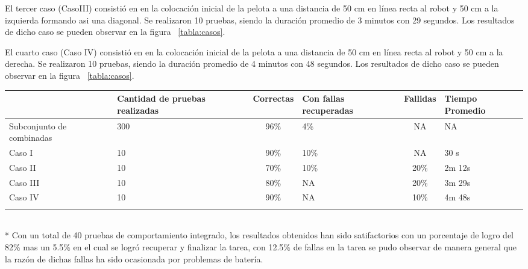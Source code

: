 El tercer caso  (CasoIII) consistió en en la colocación inicial de la pelota a una distancia de 50 cm en línea recta al robot y 50 cm a la izquierda formando asi una diagonal. Se realizaron 10 pruebas, siendo la duración promedio de 3 minutos con 29 segundos. Los resultados de dicho caso se pueden observar en la figura ~\ref{tabla:casos}. 


El cuarto caso (Caso IV) consistió en en la colocación inicial de la pelota a una distancia de 50 cm en línea recta al robot y 50 cm a la derecha. Se realizaron 10 pruebas, siendo la duración promedio de 4 minutos con 48 segundos. Los resultados de dicho caso se pueden observar en la figura ~\ref{tabla:casos}. 


\begin{tabular}{|p{3cm}|p{2cm}|c|p{2cm}|c|p{2cm}|}
\hline 
& Cantidad de 
pruebas realizadas & Correctas & Con fallas recuperadas & Fallidas & Tiempo Promedio \\ 
\hline 
Subconjunto de combinadas & 300 & 96\% & 4\% & NA & NA \\ 
\hline 
Caso I & 10 & 90\% & 10\% & NA & 30 s \\ 
\hline 
Caso II & 10 & 70\% & 10\% & 20\% & 2m 12s \\ 
\hline 
Caso III & 10 & 80\% & NA & 20\% & 3m 29s \\ 
\hline 
Caso IV & 10 & 90\% & NA & 10\% & 4m 48s \\ 
\hline 
\label{tabla:casos}
\end{tabular} 
\\*
\hspace{2cm}
\hfill
Con un total de 40 pruebas de comportamiento integrado, los resultados obtenidos han sido satifactorios con un porcentaje de logro del 82\% mas un 5.5\% en el cual se logró recuperar y finalizar la tarea, con 12.5\% de fallas en la tarea se pudo observar de manera general que la razón de dichas fallas ha sido ocasionada por problemas de batería.



